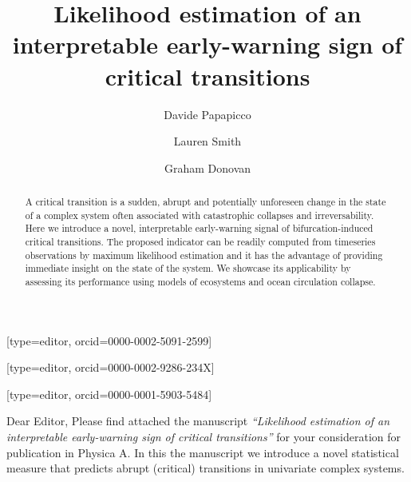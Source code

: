 \documentclass[a4paper,fleqn]{cas-sc}
\begin{document}
\let\WriteBookmarks\relax
\def\floatpagepagefraction{1}
\def\textpagefraction{.001}
\shorttitle{}

\title[mode = title]{Likelihood estimation of an interpretable early-warning sign of critical transitions}

\author[1]{Davide Papapicco}[type=editor, orcid=0000-0002-5091-2599]

\author[1]{Lauren Smith}[type=editor, orcid=0000-0002-9286-234X]

\author[1]{Graham Donovan}[type=editor, orcid=0000-0001-5903-5484]

\cormark[1]


\begin{abstract}
        A critical transition is a sudden, abrupt and potentially unforeseen change in the state of a complex system often associated with catastrophic collapses and irreversability.
        Here we introduce a novel, interpretable early-warning signal of bifurcation-induced critical transitions.
        The proposed indicator can be readily computed from timeseries observations by maximum likelihood estimation and it has the advantage of providing immediate insight on the state of the system.
        We showcase its applicability by assessing its performance using models of ecosystems and ocean circulation collapse.
\end{abstract}

\thispagestyle{empty}
\noindent
Dear Editor,
\vspace{0.5cm}
\newline
Please find attached the manuscript \textit{``Likelihood estimation of an interpretable early-warning sign of critical transitions''} for your consideration for publication in Physica A. 
\vspace{0.5cm}
\newline
In this the manuscript we introduce a novel statistical measure that predicts abrupt (critical) transitions in univariate complex systems. 
\end{document}

